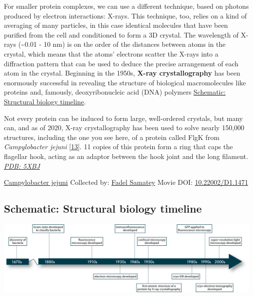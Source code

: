 \documentclass[]{tufte-book}
\begin{document}
For smaller protein complexes, we can use a different technique, based on photons produced by electron interactions: X-rays. This technique, too, relies on a kind of averaging of many particles, in this case identical molecules that have been purified from the cell and conditioned to form a 3D crystal. The wavelength of X-rays (\textasciitilde{}0.01 - 10 nm) is on the order of the distances between atoms in the crystal, which means that the atoms' electrons scatter the X-rays into a diffraction pattern that can be used to deduce the precise arrangement of each atom in the crystal. Beginning in the 1950s, \textbf{X-ray crystallography} has been enormously successful in revealing the structure of biological macromolecules like proteins and, famously, deoxyribonucleic acid (DNA) polymers \protect\hyperlink{Structural_biology_timeline}{Schematic: Structural biology timeline}.

Not every protein can be induced to form large, well-ordered crystals, but many can, and as of 2020, X-ray crystallography has been used to solve nearly 150,000 structures, including the one you see here, of a protein called FlgK from \emph{Campylobacter jejuni} {[}\protect\hyperlink{ref-bulieris2017}{13}{]}. 11 copies of this protein form a ring that caps the flagellar hook, acting as an adaptor between the hook joint and the long filament. \href{http://rcsb.org/structure/5XBJ}{\emph{PDB: 5XBJ}}



\hypertarget{htmlwidget-97385e715bdecf7f70cb}{}

\label{fig:1-9}\protect\hyperlink{tree}{Campylobacter jejuni} Collected by: \protect\hyperlink{fadel_samatey}{Fadel Samatey} Movie DOI: \href{https://doi.org/10.22002/D1.1471}{10.22002/D1.1471}

\hypertarget{Structural_biology_timeline}{%
\subsection*{Schematic: Structural biology timeline}\label{Structural_biology_timeline}}

\includegraphics[width=45.69in]{img/schematics/1_9_1}
\end{document}
